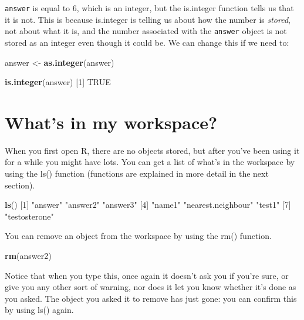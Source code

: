 \documentclass[
]{book}
\newenvironment{Shaded}{\begin{snugshade}}{\end{snugshade}}
\newcommand{\DecValTok}[1]{\textcolor[rgb]{0.00,0.00,0.81}{#1}}
\newcommand{\KeywordTok}[1]{\textcolor[rgb]{0.13,0.29,0.53}{\textbf{#1}}}
\newcommand{\NormalTok}[1]{#1}
\newcommand{\OtherTok}[1]{\textcolor[rgb]{0.56,0.35,0.01}{#1}}
\newcommand{\StringTok}[1]{\textcolor[rgb]{0.31,0.60,0.02}{#1}}
\begin{document}
\texttt{answer} is equal to 6, which is an integer, but the is.integer function tells us that it is not. This is because is.integer is telling us about how the number is \emph{stored}, not about what it is, and the number associated with the \texttt{answer} object is not stored as an integer even though it could be. We can change this if we need to:

\begin{Shaded}
\begin{Highlighting}[]
\NormalTok{answer <-}\StringTok{ }\KeywordTok{as.integer}\NormalTok{(answer)}

\KeywordTok{is.integer}\NormalTok{(answer)}
\NormalTok{[}\DecValTok{1}\NormalTok{] }\OtherTok{TRUE}
\end{Highlighting}
\end{Shaded}

\hypertarget{whats-in-my-workspace}{%
\section{What's in my workspace?}\label{whats-in-my-workspace}}

When you first open R, there are no objects stored, but after you've been using it for a while you might have lots. You can get a list of what's in the workspace by using the ls() function (functions are explained in more detail in the next section).

\begin{Shaded}
\begin{Highlighting}[]
\KeywordTok{ls}\NormalTok{()}
\NormalTok{[}\DecValTok{1}\NormalTok{] }\StringTok{"answer"}            \StringTok{"answer2"}           \StringTok{"answer3"}          
\NormalTok{[}\DecValTok{4}\NormalTok{] }\StringTok{"name1"}             \StringTok{"nearest.neighbour"} \StringTok{"test1"}            
\NormalTok{[}\DecValTok{7}\NormalTok{] }\StringTok{"testosterone"}     
\end{Highlighting}
\end{Shaded}

You can remove an object from the workspace by using the rm() function.

\begin{Shaded}
\begin{Highlighting}[]
\KeywordTok{rm}\NormalTok{(answer2)}
\end{Highlighting}
\end{Shaded}

Notice that when you type this, once again it doesn't ask you if you're sure, or give you any other sort of warning, nor does it let you know whether it's done as you asked. The object you asked it to remove has just gone: you can confirm this by using ls() again.
\end{document}
